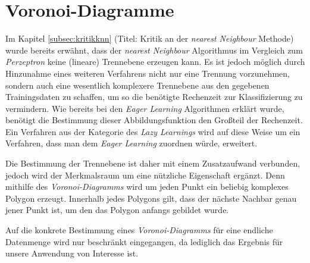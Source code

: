\documentclass[fontsize=11pt]{scrartcl}
\begin{document}
        \section{Voronoi-Diagramme}
            Im Kapitel \ref{subsec:kritikknn} (Titel: Kritik an der \emph{nearest Neighbour} Methode) wurde bereits erwähnt, dass der \emph{nearest Neighbour} Algorithmus im Vergleich zum \emph{Perzeptron} keine (lineare) Trennebene erzeugen kann. Es ist jedoch möglich durch Hinzunahme eines weiteren Verfahrens nicht nur eine Trennung vorzunehmen, sondern auch eine wesentlich komplexere Trennebene aus den gegebenen Trainingsdaten zu schaffen, um so die benötigte Rechenzeit zur Klassifizierung zu vermindern.\cite{ertel2016_p209}
            Wie bereits bei den \emph{Eager Learning} Algorithmen erklärt wurde, benötigt die Bestimmung dieser Abbildungsfunktion den Großteil der Rechenzeit. Ein Verfahren aus der Kategorie des \emph{Lazy Learnings} wird auf diese Weise um ein Verfahren, dass man dem \emph{Eager Learning} zuordnen würde, erweitert.\par Die Bestimmung der Trennebene ist daher mit einem Zusatzaufwand verbunden, jedoch wird der Merkmalsraum um eine nützliche Eigenschaft ergänzt. Denn mithilfe des \emph{Voronoi-Diagramms} wird um jeden Punkt ein beliebig komplexes Polygon erzeugt. Innerhalb jedes Polygons gilt, dass der nächste Nachbar genau jener Punkt ist, um den das Polygon anfangs gebildet wurde.\cite{ertel2016_p208} \par
            
            Auf die konkrete Bestimmung eines \emph{Voronoi-Diagramms} für eine endliche Datenmenge wird nur beschränkt eingegangen, da lediglich das Ergebnis für unsere Anwendung von Interesse ist. %
                        
\end{document}
